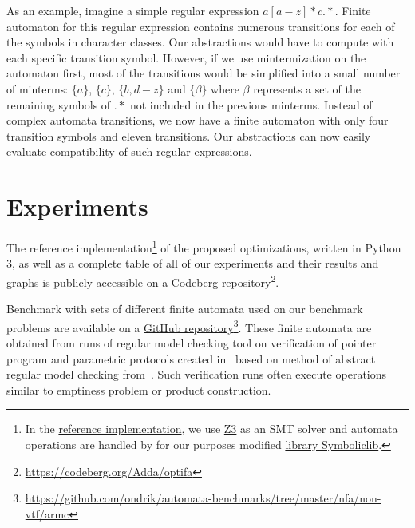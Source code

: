 As an example, imagine a simple regular expression $a[a-z]*c.*$. Finite automaton for this regular expression contains numerous transitions for each of the symbols in character classes. Our abstractions would have to compute with each specific transition symbol. However, if we use mintermization on the automaton first, most of the transitions would be simplified into a small number of minterms: $\{ a \}$, $\{ c \}$, $\{ b, d-z \}$ and $\{ \beta \}$ where $\beta$ represents a set of the remaining symbols of $.*$ not included in the previous minterms. Instead of complex automata transitions, we now have a finite automaton with only four transition symbols and eleven transitions. Our abstractions can now easily evaluate compatibility of such regular expressions.

\chapter{Experiments}\label{experimentsAndResultsChapter}

The reference implementation\footnote{In the \href{https://codeberg.org/Adda/optifa}{reference implementation}, we use \href{https://github.com/Z3Prover/z3}{Z3} as an SMT solver and automata operations are handled by for our purposes modified \href{https://codeberg.org/Adda/symboliclib}{library Symboliclib}.} of the proposed optimizations, written in Python 3, as well as a complete table of all of our experiments and their results and graphs is publicly accessible on a \href{https://codeberg.org/Adda/optifa}{Codeberg repository}\footnote{\url{https://codeberg.org/Adda/optifa}}.

Benchmark with sets of different finite automata used on our benchmark problems are available on a \href{https://github.com/ondrik/automata-benchmarks/tree/master/nfa/non-vtf/armc}{GitHub repository}\footnote{\url{https://github.com/ondrik/automata-benchmarks/tree/master/nfa/non-vtf/armc}}. These finite automata are obtained from runs of regular model checking tool on verification of pointer program and parametric protocols created in~\cite{model_checking_tool_10.1007/978-3-540-70844-5_7} based on method of abstract regular model checking from~\cite{method_model_checking_tool}. Such verification runs often execute operations similar to emptiness problem or product construction.

